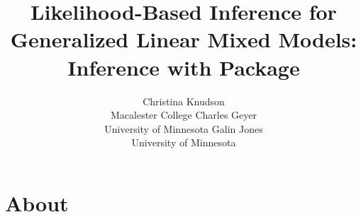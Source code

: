 \documentclass[article]{jss}
\author{Christina Knudson\\Macalester College \And 
        Charles Geyer\\University of Minnesota \And 
        Galin Jones\\University of Minnesota}
\title{ Likelihood-Based Inference for Generalized Linear Mixed Models: Inference with Package \pkg{glmm}}
\begin{document}

\section[About Java]{About }
\end{document}
